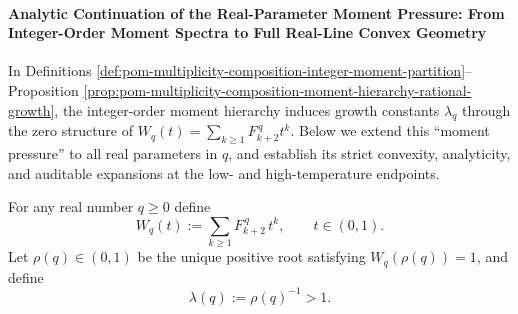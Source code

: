 \paragraph{Analytic Continuation of the Real-Parameter Moment Pressure: From Integer-Order Moment Spectra to Full Real-Line Convex Geometry}\label{par:pom-multiplicity-real-q-pressure}
In Definitions \ref{def:pom-multiplicity-composition-integer-moment-partition}--Proposition \ref{prop:pom-multiplicity-composition-moment-hierarchy-rational-growth}, the integer-order moment hierarchy induces growth constants \(\lambda_q\) through the zero structure of
\(
W_q(t)=\sum_{k\ge 1}F_{k+2}^{\,q}t^k
\).
Below we extend this ``moment pressure'' to all real parameters in \(q\), and establish its strict convexity, analyticity, and auditable expansions at the low- and high-temperature endpoints.

\begin{definition}\label{def:pom-multiplicity-real-q-pressure}
For any real number \(q\ge 0\) define
\[
W_q(t):=\sum_{k\ge 1}F_{k+2}^{\,q}\,t^k,\qquad t\in(0,1).
\]
Let \(\rho(q)\in(0,1)\) be the unique positive root satisfying \(W_q(\rho(q))=1\), and define
\[
\boxed{\;\lambda(q):=\rho(q)^{-1}>1.\;}
\]
\end{definition}


